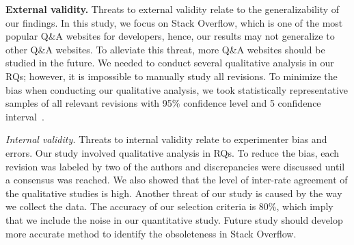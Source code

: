 \textbf{External validity.} Threats to external validity relate to the
generalizability of our findings. In this study, we focus on
Stack Overflow, which is one of the most popular Q\&A websites for developers, hence, our results may not generalize
to other Q\&A websites. To alleviate this threat, more Q\&A
websites should be studied in the future.
We needed to conduct several qualitative analysis in
our RQs; however, it is impossible to manually study all
revisions. To minimize the bias when conducting our qualitative analysis, we took statistically representative samples
of all relevant revisions with 95\% confidence level and 5%
confidence interval~\citep{StatisticsInANutshell,conf/msr/ChenSYHGNF16}. 


\emph{Internal validity.} Threats to internal validity relate to experimenter bias and errors. Our study involved qualitative analysis in RQs. To reduce the
bias, each revision was labeled by two of the authors and
discrepancies were discussed until a consensus was reached.
We also showed that the level of inter-rate agreement of the
qualitative studies is high. Another threat of our study is caused by the way we collect the data. The accuracy of our selection criteria is 80\%, which imply that we include the noise in our quantitative study. Future study should develop more accurate method to identify the obsoleteness in Stack Overflow. 

